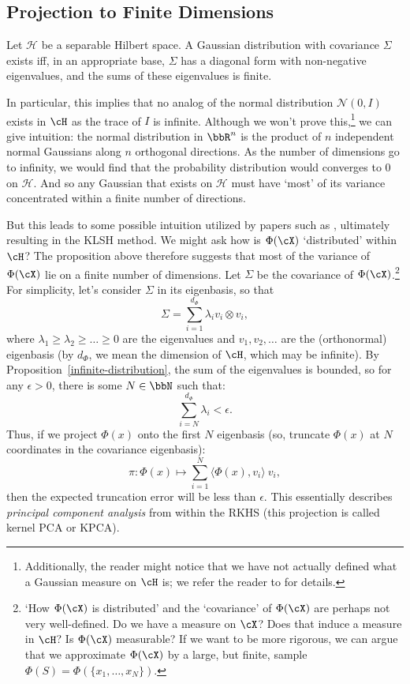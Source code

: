 \documentclass[twoside,11pt]{homework}
\begin{document}
\begin{multicols}{2}
\subsection{Projection to Finite Dimensions}

\begin{proposition}[{\cite[Example 2.2]{L2012}}] \label{infinite-distribution}Let $\mathcal{H}$ be a separable Hilbert space.
  A Gaussian distribution with covariance $\Sigma$ exists iff, in an appropriate base, $\Sigma$
  has a diagonal form with non-negative eigenvalues, and the sums of these eigenvalues is finite.
\end{proposition}

In particular, this implies that no analog of the normal distribution $\mathcal{N}(0,I)$ exists in $\cH$ as the trace of $I$ is infinite. Although we won't prove this,\footnote{Additionally, the reader might notice that we have not actually defined what a Gaussian measure on $\cH$ is; we refer the reader to \cite{L2012} for details.} we can give intuition: the normal distribution in $\bbR^n$ is the product of $n$ independent normal Gaussians along $n$ orthogonal directions. As the number of dimensions go to infinity, we would find that the probability distribution would converges to 0 on $\mathcal{H}$. And so any Gaussian that exists on $\mathcal{H}$ must have `most' of its variance concentrated within a finite number of directions.

But this leads to some possible intuition utilized by papers such as \cite{K2012,J2015}, ultimately resulting in the KLSH method. We might ask how is $\Phi(\cX)$ `distributed' within $\cH$? The proposition above therefore suggests that most of the variance of $\Phi(\cX)$ lie on a finite number of dimensions. Let $\Sigma$ be the covariance of $\Phi(\cX)$.\footnote{`How $\Phi(\cX)$ is distributed' and the `covariance' of $\Phi(\cX)$ are perhaps not very well-defined. Do we have a measure on $\cX$? Does that induce a measure in $\cH$? Is $\Phi(\cX)$ measurable? If we want to be more rigorous, we can argue that we approximate $\Phi(\cX)$ by a large, but finite, sample $\Phi(S) = \Phi(\{x_1,\dotsc, x_N\})$.} For simplicity, let's consider $\Sigma$ in its eigenbasis, so that
\[\Sigma = \sum_{i=1}^{d_\Phi} \lambda_i v_i \otimes v_i,\]
where $\lambda_1 \geq \lambda_2 \geq \dotsc \geq 0$ are the eigenvalues and $v_1,v_2,\dotsc$ are the (orthonormal) eigenbasis (by $d_\Phi$, we mean the dimension of $\cH$, which may be infinite). By Proposition~\ref{infinite-distribution}, the sum of the eigenvalues is bounded, so for any $\epsilon > 0$, there is some $N \in \bbN$ such that:
\[\sum_{i = N}^{d_{\Phi}} \lambda_i < \epsilon.\]
Thus, if we project $\Phi(x)$ onto the first $N$ eigenbasis (so, truncate $\Phi(x)$ at $N$ coordinates in the covariance eigenbasis):
\[\pi: \Phi(x) \mapsto \sum_{i=1}^N \langle \Phi(x), v_i\rangle \ v_i, \]
then the expected truncation error will be less than $\epsilon$. This essentially describes \emph{principal component analysis} from within the RKHS (this projection is called kernel PCA or KPCA).


\end{multicols}
\end{document}
